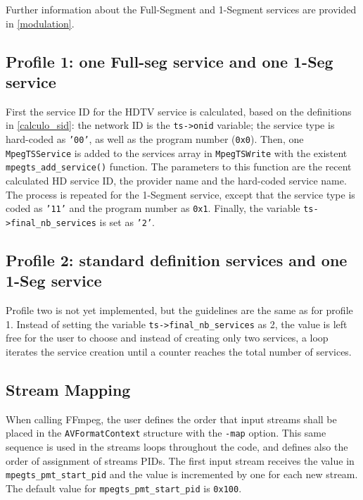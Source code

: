 \documentclass[
	12pt,				%
	openright,			%
	twoside,			%
	a4paper,			%
	brazil,
	french,				%
	english
	]{abntex2}
\begin{document}
Further information about the Full-Segment and 1-Segment services are provided in \autoref{modulation}.

\subsection{Profile 1: one Full-seg service and one 1-Seg service}

First the service ID for the HDTV service is calculated, based on the definitions in \autoref{calculo_sid}: the network ID is the \texttt{ts->onid} variable; the service type is hard-coded as \texttt{'00'}, as well as the program number (\texttt{0x0}). Then, one \texttt{MpegTSService} is added to the services array in \texttt{MpegTSWrite} with the existent \texttt{mpegts\_add\_service()} function. The parameters to this function are the recent calculated HD service ID, the provider name and the hard-coded service name. The process is repeated for the 1-Segment service, except that the service type is coded as \texttt{'11'} and the program number as \texttt{0x1}. Finally, the variable \texttt{ts->final\_nb\_services} is set as \texttt{'2'}.

\subsection{Profile 2: standard definition services and one 1-Seg service}

Profile two is not yet implemented, but the guidelines are the same as for profile 1. Instead of setting the variable \texttt{ts->final\_nb\_services} as 2, the value is left free for the user to choose and instead of creating only two services, a loop iterates the service creation until a counter reaches the total number of services.

\subsection{Stream Mapping}

When calling FFmpeg, the user defines the order that input streams shall be placed in the \texttt{AVFormatContext} structure with the \texttt{-map} option. This same sequence is used in the streams loops throughout the code, and defines also the order of assignment of streams PIDs. The first input stream receives the value in \texttt{mpegts\_pmt\_start\_pid} and the value is incremented by one for each new stream. The default value for \texttt{mpegts\_pmt\_start\_pid} is \texttt{0x100}.
\end{document}
